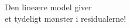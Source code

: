 \documentclass[preview]{standalone}
\begin{document}
\begin{center}
Den lineære model giver \\ et tydeligt mønster i residualerne!
\end{center}
\end{document}
